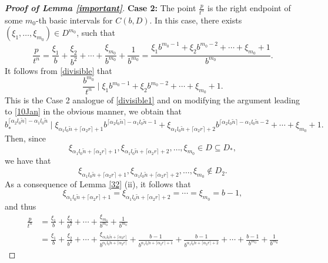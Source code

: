 \documentclass[12pt]{article}
\theoremstyle{definition}
\theoremstyle{remark}
\begin{document}
\begin{proof}[\rm \textbf{Proof of Lemma \ref{important}}]
\noindent \textbf{Case 2:} The point $\frac{p}{t^{n}}$ is the right endpoint of some $m_{0}$-th basic intervals for $C(b,D)$. In this case,
there exists $(\xi_{1},\ldots,\xi_{ m_{0}})\in D^{m_{0}}$, such that
$$\frac{p}{t^{n}}=\frac{\xi_{1}}{b}+\frac{\xi_{2}}{b^{2}}+\cdots+\frac{\xi_{ m_{0}}}{b^{m_{0}}}+\frac{1}{b^{m_{0}}}=\frac{\xi_{1}b^{m_{0}-1}+\xi_{2}b^{m_{0}-2}+\cdots+ \xi_{ m_{0}}+1}{b^{m_{0}}}.$$
It follows from \eqref{divisible} that
\begin{equation*} 
\frac{b^{m_{0}}}{t^{n}}\mid\xi_{1}b^{m_{0}-1}+\xi_{2}b^{m_{0}-2}+\cdots+ \xi_{ m_{0}}+1.
\end{equation*} 
This is the Case 2 analogue of  \eqref{divisible1}  and on modifying the argument leading to \eqref{10Jan} in the obvious manner, we obtain that
$$b_{*}^{\lceil\alpha_{2}l_{0}\tilde{n}\rceil-\alpha_{1}l_{0}\tilde{n}}\mid\xi_{\alpha_{1}l_{0}\tilde{n}+\lceil\alpha_{2} r\rceil+1}b^{\lceil\alpha_{2}l_{0}\tilde{n}\rceil-\alpha_{1}l_{0}\tilde{n}-1}+  \xi_{\alpha_{1}l_{0}\tilde{n}+\lceil\alpha_{2} r\rceil+2}b^{\lceil\alpha_{2}l_{0}\tilde{n}\rceil-\alpha_{1}l_{0}\tilde{n}-2}+\cdots+\xi_{m_{0}}+1.$$
Then, since $$ \xi_{\alpha_{1}l_{0}\tilde{n}+\lceil\alpha_{2} r\rceil+1},\xi_{\alpha_{1}l_{0}\tilde{n}+\lceil\alpha_{2} r\rceil+2},\ldots,\xi_{m_{0}}\in D\subseteq D_{*},$$ we have that $$ \xi_{\alpha_{1}l_{0}\tilde{n}+\lceil\alpha_{2} r\rceil+1},\xi_{\alpha_{1}l_{0}\tilde{n}+\lceil\alpha_{2} r\rceil+2},\ldots,\xi_{m_{0}}\notin D_{2}.$$
As a consequence of Lemma \ref{32} (ii), it follows that 
$$ \xi_{\alpha_{1}l_{0}\tilde{n}+\lceil\alpha_{2} r\rceil+1}=\xi_{\alpha_{1}l_{0}\tilde{n}+\lceil\alpha_{2} r\rceil+2}=\cdots=\xi_{m_{0}}=b-1 , $$
and thus 
\begin{equation*}
\begin{aligned}
\frac{p}{t^{n}}&=\frac{\xi_{1}}{b}+\frac{\xi_{2}}{b^{2}}+\cdots+\frac{\xi_{ m_{0}}}{b^{m_{0}}}+\frac{1}{b^{m_{0}}} \\[2ex]
&=\frac{\xi_{1}}{b}+\frac{\xi_{2}}{b^{2}}+\cdots+\frac{\xi_{\alpha_{1}l_{0}\tilde{n}+\lceil\alpha_{2} r\rceil}}{b^{\alpha_{1}l_{0}\tilde{n}+\lceil\alpha_{2} r\rceil}}+\frac{b-1}{b^{\alpha_{1}l_{0}\tilde{n}+\lceil\alpha_{2} r\rceil+1}}+\frac{b-1}{b^{\alpha_{1}l_{0}\tilde{n}+\lceil\alpha_{2} r\rceil+2}}+\cdots+\frac{b-1}{b^{m_{0}}}+\frac{1}{b^{m_{0}}} 

\end{aligned}
\end{equation*}
\end{proof}
\end{document}
